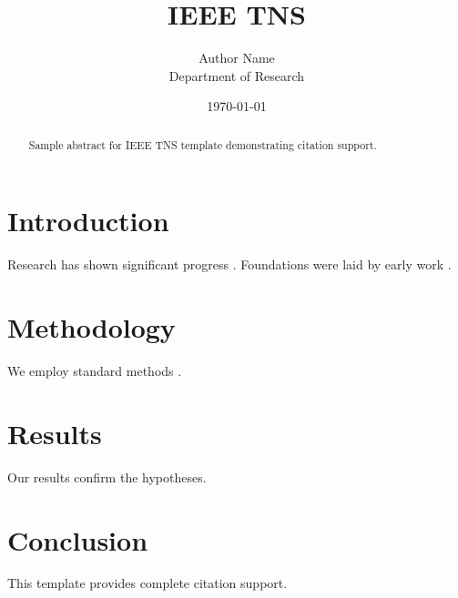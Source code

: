 ﻿\documentclass{IEEEtran}
\title{IEEE TNS}
\author{Author Name \\ \small Department of Research}
\date{\today}
\begin{document}
\maketitle

\begin{abstract}
Sample abstract for IEEE TNS template demonstrating citation support.
\end{abstract}

\section{Introduction}
Research has shown significant progress \citep{einstein1905}. Foundations were laid by early work \citep{turing1950}.

\section{Methodology}
We employ standard methods \citep{knuth1984}.

\section{Results}
Our results confirm the hypotheses.

\section{Conclusion}
This template provides complete citation support.



\end{document}
